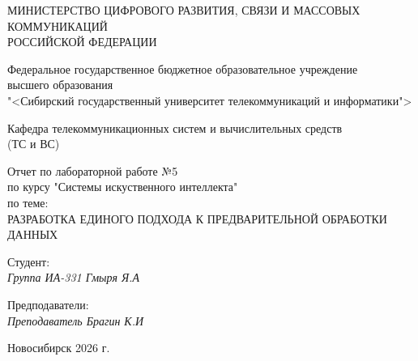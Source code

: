 \thispagestyle{empty}

\begin{center}
    МИНИСТЕРСТВО ЦИФРОВОГО РАЗВИТИЯ, СВЯЗИ И МАССОВЫХ КОММУНИКАЦИЙ \\ РОССИЙСКОЙ ФЕДЕРАЦИИ

    \vspace{20pt}

    Федеральное государственное бюджетное образовательное учреждение  \\  высшего образования \\
    "<Сибирский государственный университет телекоммуникаций и информатики"> \\

    \vspace{20pt}

    Кафедра телекоммуникационных систем и вычислительных средств \\  (ТС и ВС)
\end{center}

\vfill

\begin{center}
    Отчет по лабораторной работе №5 \\  
    по курсу "Системы искуственного интеллекта" \\
    \vspace{20pt}
    по теме: \\
    \uppercase{РАЗРАБОТКА ЕДИНОГО
ПОДХОДА К ПРЕДВАРИТЕЛЬНОЙ ОБРАБОТКИ ДАННЫХ}
\end{center}

\vfill

    \noindent Студент: \\
    \textit{Группа ИА-331 \hfill Гмыря Я.А} 

    \vspace{20pt}
 
    \noindent Предподаватели: \\
    \textit{Преподаватель \hfill Брагин К.И} \\
\vfill

\begin{center}
    Новосибирск 2026 г.
\end{center}